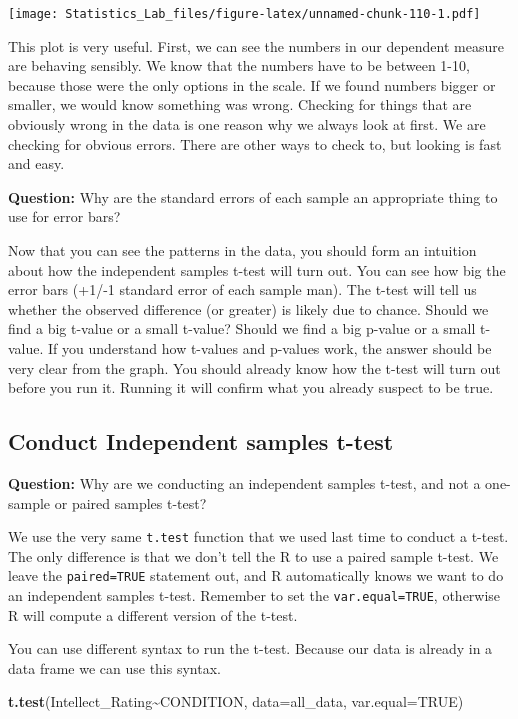 \documentclass[
]{book}
\newenvironment{Shaded}{\begin{snugshade}}{\end{snugshade}}
\newcommand{\AttributeTok}[1]{\textcolor[rgb]{0.13,0.29,0.53}{#1}}
\newcommand{\ConstantTok}[1]{\textcolor[rgb]{0.56,0.35,0.01}{#1}}
\newcommand{\FunctionTok}[1]{\textcolor[rgb]{0.13,0.29,0.53}{\textbf{#1}}}
\newcommand{\NormalTok}[1]{#1}
\newcommand{\SpecialCharTok}[1]{\textcolor[rgb]{0.81,0.36,0.00}{\textbf{#1}}}
\begin{document}
\texttt{[image: Statistics\_Lab\_files/figure-latex/unnamed-chunk-110-1.pdf]}

This plot is very useful. First, we can see the numbers in our dependent measure are behaving sensibly. We know that the numbers have to be between 1-10, because those were the only options in the scale. If we found numbers bigger or smaller, we would know something was wrong. Checking for things that are obviously wrong in the data is one reason why we always look at first. We are checking for obvious errors. There are other ways to check to, but looking is fast and easy.

\textbf{Question:} Why are the standard errors of each sample an appropriate thing to use for error bars?

Now that you can see the patterns in the data, you should form an intuition about how the independent samples t-test will turn out. You can see how big the error bars (+1/-1 standard error of each sample man). The t-test will tell us whether the observed difference (or greater) is likely due to chance. Should we find a big t-value or a small t-value? Should we find a big p-value or a small t-value. If you understand how t-values and p-values work, the answer should be very clear from the graph. You should already know how the t-test will turn out before you run it. Running it will confirm what you already suspect to be true.

\hypertarget{conduct-independent-samples-t-test}{%
\subsection{Conduct Independent samples t-test}\label{conduct-independent-samples-t-test}}

\textbf{Question:} Why are we conducting an independent samples t-test, and not a one-sample or paired samples t-test?

We use the very same \texttt{t.test} function that we used last time to conduct a t-test. The only difference is that we don't tell the R to use a paired sample t-test. We leave the \texttt{paired=TRUE} statement out, and R automatically knows we want to do an independent samples t-test. Remember to set the \texttt{var.equal=TRUE}, otherwise R will compute a different version of the t-test.

You can use different syntax to run the t-test. Because our data is already in a data frame we can use this syntax.

\begin{Shaded}
\begin{Highlighting}[]
\FunctionTok{t.test}\NormalTok{(Intellect\_Rating}\SpecialCharTok{\textasciitilde{}}\NormalTok{CONDITION, }\AttributeTok{data=}\NormalTok{all\_data, }\AttributeTok{var.equal=}\ConstantTok{TRUE}\NormalTok{)}
\end{Highlighting}
\end{Shaded}
\end{document}
